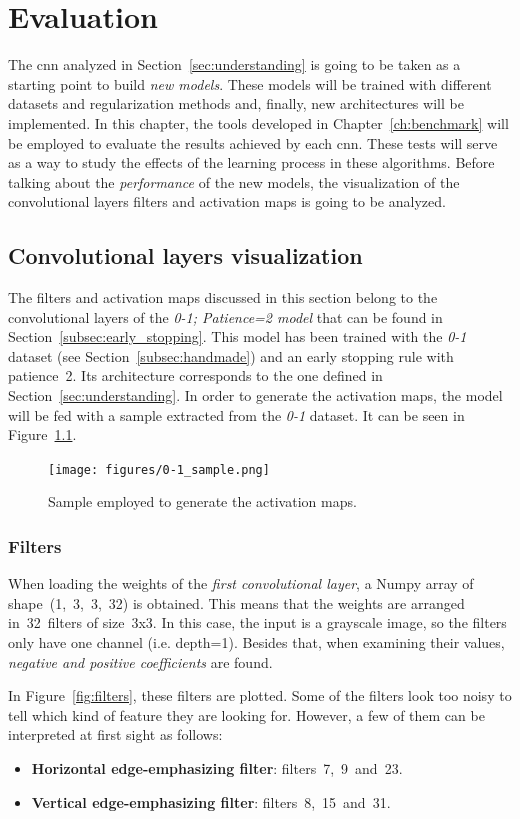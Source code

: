 \chapter{Evaluation}\label{sec:new_models}
The \gls{cnn} analyzed in Section~\ref{sec:understanding} is going to be taken as a starting point to build \emph{new models}. These models will be trained with different datasets and regularization methods and, finally, new architectures will be implemented. In this chapter, the tools developed in Chapter~\ref{ch:benchmark} will be employed to evaluate the results achieved by each \gls{cnn}. These tests will serve as a way to study the effects of the learning process in these algorithms. Before talking about the \emph{performance} of the new models, the visualization of the convolutional layers filters and activation maps is going to be analyzed.

\section{Convolutional layers visualization}
The filters and activation maps discussed in this section belong to the convolutional layers of the \emph{\textit{0-1; Patience=2} model} that can be found in Section~\ref{subsec:early_stopping}. This model has been trained with the \textit{0-1} dataset (see Section~\ref{subsec:handmade}) and an early stopping rule with patience~2. Its architecture corresponds to the one defined in Section~\ref{sec:understanding}. In order to generate the activation maps, the model will be fed with a sample extracted from the \textit{0-1} dataset. It can be seen in Figure~\ref{fig:sample}.
\begin{figure}
	\centering
	\texttt{[image: figures/0-1\_sample.png]}
	\caption{Sample employed to generate the activation maps.}
	\label{fig:sample}
\end{figure}

\subsection{Filters}
When loading the weights of the \emph{first convolutional layer}, a Numpy array of shape~(1,~3,~3,~32) is obtained. This means that the weights are arranged in~32~filters of size~3x3. In this case, the input is a grayscale image, so the filters only have one channel (i.e. depth=1). Besides that, when examining their values, \emph{negative and positive coefficients} are found.

In Figure~\ref{fig:filters}, these filters are plotted. Some of the filters look too noisy to tell which kind of feature they are looking for. However, a few of them can be interpreted at first sight as follows:
\begin{itemize}
	\item \textbf{Horizontal edge-emphasizing filter}: filters~7,~9~and~23.
	\item \textbf{Vertical edge-emphasizing filter}: filters~8,~15~and~31.	
\end{itemize}

